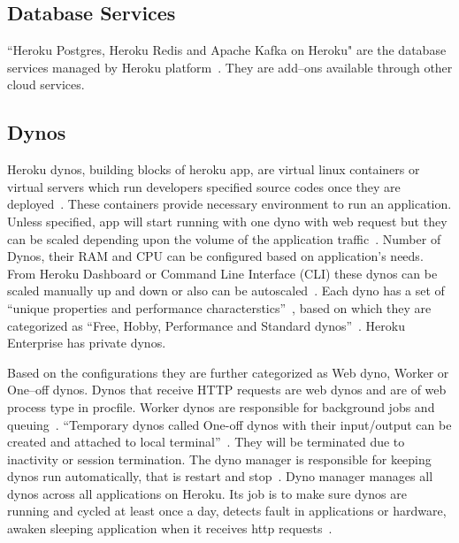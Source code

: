 \subsection{Database Services}
 ``Heroku Postgres, Heroku Redis and Apache Kafka on Heroku" are the database
 services managed by Heroku platform~\cite{hid-sp18-415-www-wikipedia-org}.
 They are add--ons available through other cloud services.
 
 


\subsection{Dynos}

 Heroku dynos, building blocks of heroku app, are virtual linux containers or
 virtual servers which run developers specified source codes once they are 
 deployed~\cite{hid-sp18-415-www-heroku-dynos}. These containers provide necessary
 environment
 to run an application. Unless specified, app will start running with one dyno 
 with  web request but they can be scaled depending upon the volume of the 
 application traffic~\cite{hid-sp18-415-www-heroku-dynos}. Number of Dynos, their RAM and 
 CPU can be 
 configured based on application's needs. From Heroku Dashboard or Command Line
 Interface (CLI) these dynos can be scaled manually up and down or also can be 
 autoscaled~\cite{hid-sp18-415-www-heroku-dynos}. Each dyno has a set of 
 ``unique properties and performance characterstics''~\cite{hid-sp18-415-www-heroku-dynos}, 
 based on which they are categorized as ``Free, Hobby, Performance and Standard 
 dynos''~\cite{hid-sp18-415-www-devcenter-dynos}. Heroku Enterprise has private dynos.

 Based on the configurations they are further
 categorized as Web dyno, Worker or One--off dynos. Dynos that receive HTTP
 requests are web dynos and are of web process type in procfile. Worker dynos
 are responsible for background jobs and queuing~\cite{hid-sp18-415-www-devcenter-dynos}.
 ``Temporary dynos called One-off dynos with their input/output can be created 
 and attached to local terminal''~\cite{hid-sp18-415-www-how-heroku-works}. They will be 
 terminated due to inactivity or session termination.
 The dyno manager is responsible for keeping
 dynos run automatically, that is restart and stop~\cite{hid-sp18-415-www-devcenter-dynos}. 
 Dyno manager manages all dynos across all applications on Heroku. Its job is 
to make sure dynos are running and cycled at least once a day, detects fault
 in applications or hardware, awaken sleeping application when it receives http
requests~\cite{hid-sp18-415-www-how-heroku-works}. 


